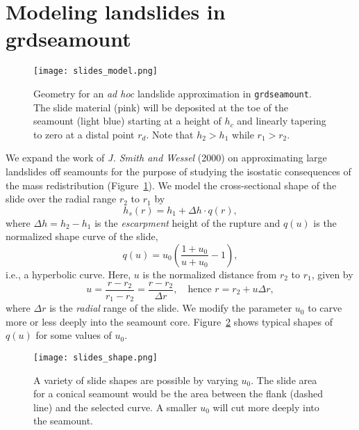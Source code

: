 \documentclass[12pt,letterpaper,margin=0.5in]{report}
\begin{document}
\section{Modeling landslides in grdseamount}

\begin{figure}[h!]
  \centering
  \texttt{[image: slides\_model.png]}
  \caption{Geometry for an \emph{ad hoc} landslide approximation in \texttt{grdseamount}.  The slide material (pink)
  will be deposited at the toe of the seamount (light blue) starting at a height of $h_c$ and linearly
  tapering to zero at a distal point $r_d$. Note that $h_2 > h_1$ while $r_1 > r_2$.}
  \label{slides_model}
\end{figure}

We expand the work of {\it J. Smith and Wessel} (2000) on approximating large landslides off seamounts
for the purpose of studying the isostatic consequences of the mass redistribution (Figure~\ref{slides_model}).  We model the
cross-sectional shape of the slide over the radial range $r_2$ to $r_1$ by
\begin{equation}
h_s(r) = h_1 + \Delta h \cdot q(r),
\end{equation}
where $\Delta h = h_2 - h_1$ is the \emph{escarpment} height of the rupture and $q(u)$ is the normalized shape curve of the slide,
\begin{equation}
q(u) = u_0 \left (\frac{1 + u_0}{u + u_0} - 1 \right ),
\end{equation}
i.e., a hyperbolic curve.  Here, $u$ is the normalized distance from $r_2$ to $r_1$, given by
\begin{equation}
u = \frac{r-r_2}{r_1 - r_2} = \frac{r-r_2}{\Delta r}, \quad \mbox{hence } r = r_2 + u \Delta r,
\end{equation}
where $\Delta r$ is the \emph{radial} range of the slide. We modify the parameter $u_0$ to carve more or less deeply into the seamount core.
Figure~\ref{slides_shape} shows typical shapes of $q(u)$ for some values of $u_0$.
\begin{figure}[h!]
  \centering
  \texttt{[image: slides\_shape.png]}
  \caption{A variety of slide shapes are possible by varying $u_0$.  The slide area for a conical seamount would be the area
  between the flank (dashed line) and the selected curve. A smaller $u_0$ will cut more deeply into the seamount.}
  \label{slides_shape}
\end{figure}
\end{document}

